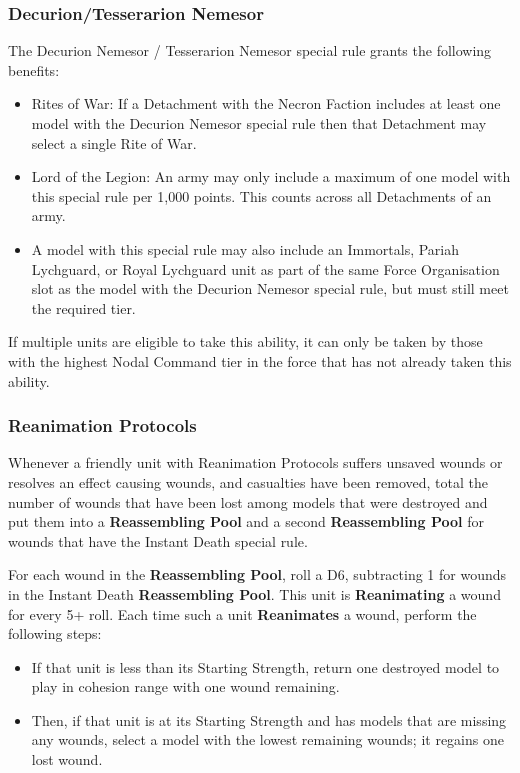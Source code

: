 \begin{multicols}{2}
\subsubsection{Decurion/Tesserarion Nemesor} \label{Decurion Nemesor} \label{Tesserarion Nemesor}

The Decurion Nemesor / Tesserarion Nemesor special rule grants the following benefits:

\begin{itemize}
	\itemsep 0pt
	\item Rites of War: If a Detachment with the Necron Faction includes at least one model with the Decurion Nemesor special rule then that Detachment may select a single Rite of War. 
	\item Lord of the Legion: An army may only include a maximum of one model with this special rule per 1,000 points. This counts across all Detachments of an army.
	\item A model with this special rule may also include an Immortals, Pariah Lychguard, or Royal Lychguard unit as part of the same Force Organisation slot as the model with the Decurion Nemesor special rule, but must still meet the required  tier.
\end{itemize}

If multiple units are eligible to take this ability, it can only be taken by those with the highest Nodal Command tier in the force that has not already taken this ability. 

\subsubsection{Reanimation Protocols} \label{Reanimation Protocols}

Whenever a friendly unit with Reanimation Protocols suffers unsaved wounds or resolves an effect causing wounds, and casualties have been removed, total the number of wounds that have been lost among models that were destroyed and put them into a \textbf{Reassembling Pool} and a second \textbf{Reassembling Pool} for wounds that have the Instant Death special rule.

For each wound in the \textbf{Reassembling Pool}, roll a D6, subtracting 1 for wounds in the Instant Death \textbf{Reassembling Pool}. This unit is \textbf{Reanimating} a wound for every 5+ roll. Each time such a unit \textbf{Reanimates} a wound, perform the following steps:

\begin{itemize}
	\itemsep 0pt
	\item If that unit is less than its Starting Strength, return one destroyed model to play in cohesion range with one wound remaining.
	\item Then, if that unit is at its Starting Strength and has models that are missing any wounds, select a model with the lowest remaining wounds; it regains one lost wound.
\end{itemize}


\end{multicols}
